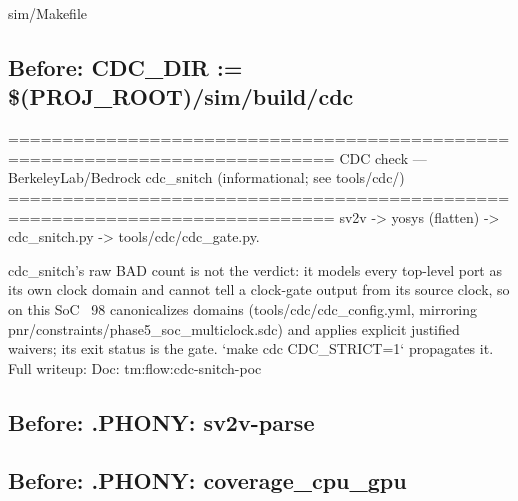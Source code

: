 \begin{relocated}{sim/Makefile}
\subsection*{Before: CDC\_DIR     := \$(PROJ\_ROOT)/sim/build/cdc}

\begin{textblock}
============================================================================
CDC check — BerkeleyLab/Bedrock cdc_snitch (informational; see tools/cdc/)
============================================================================
sv2v -> yosys (flatten) -> cdc_snitch.py -> tools/cdc/cdc_gate.py.

cdc_snitch's raw BAD count is not the verdict: it models every top-level port
as its own clock domain and cannot tell a clock-gate output from its source
clock, so on this SoC ~98%
canonicalizes domains (tools/cdc/cdc_config.yml, mirroring
pnr/constraints/phase5_soc_multiclock.sdc) and applies explicit justified
waivers; its exit status is the gate. `make cdc CDC_STRICT=1` propagates it.
Full writeup: Doc: tm:flow:cdc-snitch-poc
\end{textblock}

\subsection*{Before: .PHONY: sv2v-parse}


\subsection*{Before: .PHONY: coverage\_cpu\_gpu}


\end{relocated}
